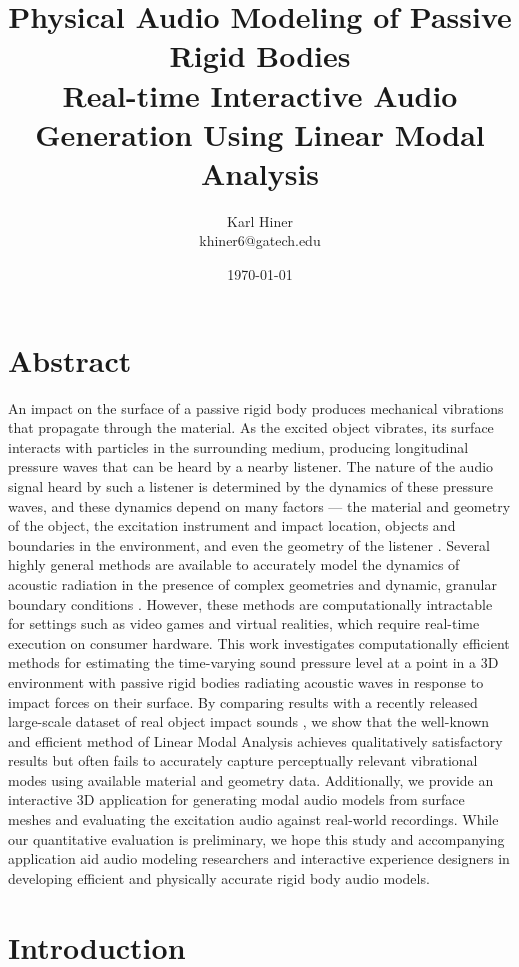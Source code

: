 \documentclass[12pt]{article}
\title{
  Physical Audio Modeling of Passive Rigid Bodies\\
  \large Real-time Interactive Audio Generation Using Linear Modal Analysis
}
\author{Karl Hiner\\khiner6@gatech.edu}
\date{\today}
\begin{document}
\maketitle

\section{Abstract}

An impact on the surface of a passive rigid body produces mechanical vibrations that propagate through the material.
As the excited object vibrates, its surface interacts with particles in the surrounding medium, producing longitudinal pressure waves that can be heard by a nearby listener.
The nature of the audio signal heard by such a listener is determined by the dynamics of these pressure waves, and these dynamics depend on many factors --- the material and geometry of the object, the excitation instrument and impact location, objects and boundaries in the environment, and even the geometry of the listener \cite{starch_perimetry_1908}.
Several highly general methods are available to accurately model the dynamics of acoustic radiation in the presence of complex geometries \cite{wang_wbss_2018} and dynamic, granular boundary conditions \cite{schneider_fdtd_2010}.
However, these methods are computationally intractable for settings such as video games and virtual realities, which require real-time execution on consumer hardware.
This work investigates computationally efficient methods for estimating the time-varying sound pressure level at a point in a 3D environment with passive rigid bodies radiating acoustic waves in response to impact forces on their surface.
By comparing results with a recently released large-scale dataset of real object impact sounds \cite{clarke_realimpact_2023}, we show that the well-known and efficient method of Linear Modal Analysis achieves qualitatively satisfactory results but often fails to accurately capture perceptually relevant vibrational modes using available material and geometry data.
Additionally, we provide an interactive 3D application for generating modal audio models from surface meshes and evaluating the excitation audio against real-world recordings.
While our quantitative evaluation is preliminary, we hope this study and accompanying application aid audio modeling researchers and interactive experience designers in developing efficient and physically accurate rigid body audio models.

\section{Introduction}
\end{document}
